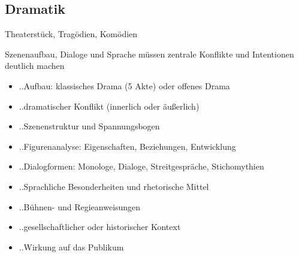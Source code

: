 
\subsection{Dramatik}

 Theaterstück, Tragödien, Komödien

 Szenenaufbau, Dialoge und Sprache müssen zentrale Konflikte und Intentionen deutlich machen

\begin{itemize}
    \item ..Aufbau: klassisches Drama (5 Akte) oder offenes Drama
    \item ..dramatischer Konflikt (innerlich oder äußerlich)
    \item ..Szenenstruktur und Spannungsbogen
    \item ..Figurenanalyse: Eigenschaften, Beziehungen, Entwicklung
    \item ..Dialogformen: Monologe, Dialoge, Streitgespräche, Stichomythien
    \item ..Sprachliche Besonderheiten und rhetorische Mittel
    \item ..Bühnen- und Regieanweisungen
    \item ..gesellschaftlicher oder historischer Kontext
    \item ..Wirkung auf das Publikum
\end{itemize}
